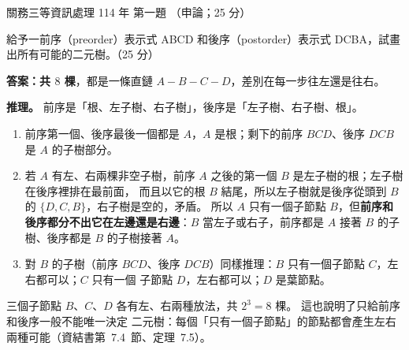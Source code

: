 \begin{pastexam}[label={px:gw3-114-ds-01}]{關務三等資訊處理 114 年 第一題}
（申論；25 分）

給予一前序（preorder）表示式 ABCD 和後序（postorder）表示式 DCBA，試畫出所有可能的二元樹。（25 分）
\end{pastexam}

\begin{pastsoln}
\textbf{答案：共 $8$ 棵}，都是一條直鏈 $A - B - C - D$，差別在每一步往左還是往右。

\textbf{推理。} 前序是「根、左子樹、右子樹」，後序是「左子樹、右子樹、根」。
\begin{enumerate}[nosep]
\item 前序第一個、後序最後一個都是 $A$，$A$ 是根；剩下的前序 $BCD$、後序 $DCB$ 是 $A$ 的子樹部分。
\item 若 $A$ 有左、右兩棵非空子樹，前序 $A$ 之後的第一個 $B$ 是左子樹的根；左子樹在後序裡排在最前面，
而且以它的根 $B$ 結尾，所以左子樹就是後序從頭到 $B$ 的 $\{D, C, B\}$，右子樹是空的，矛盾。 所以
$A$ 只有一個子節點 $B$，但\textbf{前序和後序都分不出它在左邊還是右邊}：$B$ 當左子或右子，前序都是
$A$ 接著 $B$ 的子樹、後序都是 $B$ 的子樹接著 $A$。
\item 對 $B$ 的子樹（前序 $BCD$、後序 $DCB$）同樣推理：$B$ 只有一個子節點 $C$，左右都可以；$C$ 只有一個
子節點 $D$，左右都可以；$D$ 是葉節點。
\end{enumerate}
三個子節點 $B$、$C$、$D$ 各有左、右兩種放法，共 $2^3 = 8$ 棵。 這也說明了只給前序和後序一般不能唯一決定
二元樹：每個「只有一個子節點」的節點都會產生左右兩種可能（資結書第~7.4~節、定理~7.5）。


\end{pastsoln}
